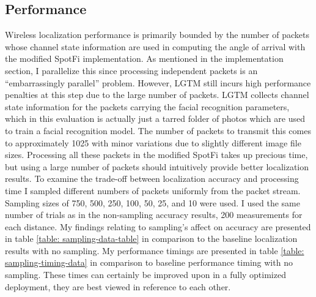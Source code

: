 \documentclass[12pt]{report}
\begin{document}
\subsection{Performance}
Wireless localization performance is primarily bounded by the number of packets whose channel state information are used in computing the angle of arrival with the modified SpotFi implementation. As mentioned in the implementation section, I parallelize this since processing independent packets is an ``embarrassingly parallel'' problem. However, LGTM still incurs high performance penalties at this step due to the large number of packets. LGTM collects channel state information for the packets carrying the facial recognition parameters, which in this evaluation is actually just a tarred folder of photos which are used to train a facial recognition model. The number of packets to transmit this comes to approximately 1025 with minor variations due to slightly different image file sizes. Processing all these packets in the modified SpotFi takes up precious time, but using a large number of packets should intuitively provide better localization results. To examine the trade-off between localization accuracy and processing time I sampled different numbers of packets uniformly from the packet stream. Sampling sizes of 750, 500, 250, 100, 50, 25, and 10 were used. I used the same number of trials as in the non-sampling accuracy results, 200 measurements for each distance. My findings relating to sampling's affect on accuracy are presented in table \ref{table: sampling-data-table} in comparison to the baseline localization results with no sampling. My performance timings are presented in table \ref{table: sampling-timing-data} in comparison to baseline performance timing with no sampling. These times can certainly be improved upon in a fully optimized deployment, they are best viewed in reference to each other. \par
\end{document}
